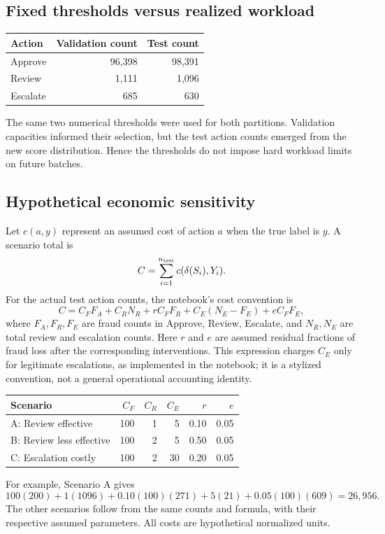 \documentclass[11pt,a4paper]{article}
\begin{document}
\subsection{Fixed thresholds versus realized workload}
\begin{center}\begin{tabular}{lrr}\toprule Action & Validation count & Test count\\\midrule Approve&96,398&98,391\\ Review&1,111&1,096\\ Escalate&685&630\\\bottomrule\end{tabular}\end{center}
The same two numerical thresholds were used for both partitions. Validation capacities informed their selection, but the test action counts emerged from the new score distribution. Hence the thresholds do not impose hard workload limits on future batches.

\subsection{Hypothetical economic sensitivity}
Let $c(a,y)$ represent an assumed cost of action $a$ when the true label is $y$. A scenario total is
\begin{equation}C=\sum_{i=1}^{n_{\rm test}}c(\delta(S_i),Y_i).\end{equation}
For the actual test action counts, the notebook's cost convention is
\begin{equation}\label{eq:cost-components}
C=C_F F_A+C_R N_R+rC_F F_R+C_E(N_E-F_E)+eC_F F_E,
\end{equation}
where $F_A,F_R,F_E$ are fraud counts in Approve, Review, Escalate, and $N_R,N_E$ are total review and escalation counts. Here $r$ and $e$ are assumed residual fractions of fraud loss after the corresponding interventions. This expression charges $C_E$ only for legitimate escalations, as implemented in the notebook; it is a stylized convention, not a general operational accounting identity.
\begin{center}\begin{tabular}{lrrrrr}\toprule Scenario & $C_F$ & $C_R$ & $C_E$ & $r$ & $e$\\\midrule A: Review effective &100&1&5&0.10&0.05\\ B: Review less effective &100&2&5&0.50&0.05\\ C: Escalation costly &100&2&30&0.20&0.05\\\bottomrule\end{tabular}\end{center}
For example, Scenario A gives
\[
100(200)+1(1096)+0.10(100)(271)+5(21)+0.05(100)(609)=26{,}956.
\]
The other scenarios follow from the same counts and formula, with their respective assumed parameters. All costs are hypothetical normalized units.
\end{document}
